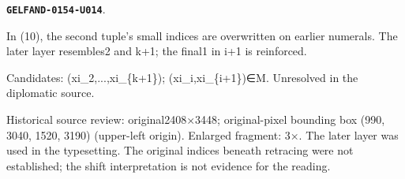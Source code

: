 \documentclass[11pt]{article}
\theoremstyle{definition}
\theoremstyle{remark}
\begin{document}
\par\noindent\leavevmode{}\label{GELFAND-0154-U014}\label{GELFAND-P001418:eq10-overwritten-indices:note}\textbf{\texttt{GELFAND-0154-U014}}.\nopagebreak[4]\par
In (10), the second tuple’s small indices are overwritten on earlier numerals. The later layer resembles2 and k+1; the final1 in i+1 is reinforced.\par
Candidates: (xi\_2,...,xi\_\{k+1\}); (xi\_i,xi\_\{i+1\})∈M. Unresolved in the diplomatic source.\par
Historical source review: original2408×3448; original-pixel bounding box (990, 3040, 1520, 3190) (upper-left origin). Enlarged fragment: 3×. The later layer was used in the typesetting. The original indices beneath retracing were not established; the shift interpretation is not evidence for the reading.\par\medskip
\end{document}
